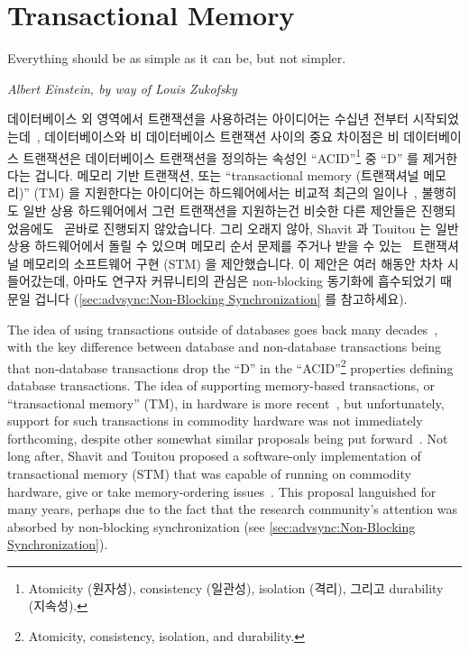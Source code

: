 
\section{Transactional Memory}
\label{sec:future:Transactional Memory}
\epigraph{Everything should be as simple as it can be, but not simpler.}
	 {\emph{Albert Einstein, by way of Louis Zukofsky}}

데이터베이스 외 영역에서 트랜잭션을 사용하려는 아이디어는 수십년 전부터
시작되었는데~\cite{DBLomet1977SIGSOFT,Knight:1986:AMF:319838.319854,Herlihy93a},
데이터베이스와 비 데이터베이스 트랜잭션 사이의 중요 차이점은 비 데이터베이스
트랜잭션은 데이터베이스 트랜잭션을 정의하는 속성인 ``ACID''\footnote{
	Atomicity (원자성), consistency (일관성), isolation (격리), 그리고
	durability (지속성).}
중 ``D'' 를 제거한다는 겁니다.
메모리 기반 트랜잭션, 또는 ``transactional memory (트랜잭셔널 메모리)'' (TM) 을
지원한다는 아이디어는 하드웨어에서는 비교적 최근의 일이나~\cite{Herlihy93a},
불행히도 일반 상용 하드웨어에서 그런 트랜잭션을 지원하는건 비슷한 다른 제안들은
진행되었음에도~\cite{JMStone93} 곧바로 진행되지 않았습니다.
그리 오래지 않아, Shavit 과 Touitou 는 일반 상용 하드웨어에서 돌릴 수 있으며
메모리 순서 문제를 주거나 받을 수 있는~\cite{Shavit95} 트랜잭셔널 메모리의
소프트웨어 구현 (STM) 을 제안했습니다.
이 제안은 여러 해동안 차차 시들어갔는데, 아마도 연구자 커뮤니티의 관심은
non-blocking 동기화에 흡수되었기 때문일 겁니다 (\cref{sec:advsync:Non-Blocking
Synchronization} 를 참고하세요).

\iffalse

The idea of using transactions outside of databases goes back many
decades~\cite{DBLomet1977SIGSOFT,Knight:1986:AMF:319838.319854,Herlihy93a},
with the key difference between
database and non-database transactions being that non-database transactions
drop the ``D'' in the ``ACID''\footnote{
	Atomicity, consistency, isolation, and durability.}
properties defining database transactions.
The idea of supporting memory-based transactions, or ``transactional memory''
(TM), in hardware
is more recent~\cite{Herlihy93a}, but unfortunately, support for such
transactions in commodity hardware was not immediately forthcoming,
despite other somewhat similar proposals being put forward~\cite{JMStone93}.
Not long after, Shavit and Touitou proposed a software-only implementation
of transactional memory (STM) that was capable of running on commodity
hardware, give or take memory-ordering issues~\cite{Shavit95}.
This proposal languished for many years, perhaps due to the fact that
the research community's attention was absorbed by non-blocking
synchronization (see \cref{sec:advsync:Non-Blocking Synchronization}).

